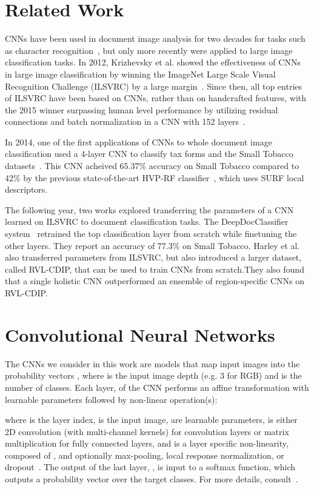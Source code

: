 \documentclass[10pt, conference, compsocconf]{IEEEtran}
\begin{document}
\section{Related Work}

CNNs have been used in document image analysis for two decades for tasks such as character recognition~\cite{lecun98,simard03}, but only more recently were applied to large image classification tasks.
In 2012, Krizhevsky et al. showed the effectiveness of CNNs in large image classification by winning the ImageNet Large Scale Visual Recognition Challenge (ILSVRC) by a large margin~\cite{krizhevsky12}.
Since then, all top entries of ILSVRC have been based on CNNs, rather than on handcrafted features, with the 2015 winner surpassing human level performance by utilizing residual connections and batch normalization in a CNN with 152 layers~\cite{he15residual}.

In 2014, one of the first applications of CNNs to whole document image classification used a 4-layer CNN to classify tax forms and the Small Tobacco datasets~\cite{kang14}.
This CNN acheived 65.37\% accuracy on Small Tobacco compared to 42\% by the previous state-of-the-art HVP-RF classifier~\cite{kumar13}, which uses SURF local descriptors.

The following year, two works explored transferring the parameters of a CNN learned on ILSVRC to document classification tasks.
The DeepDocClassifier system~\cite{afzal15} retrained the top classification layer from scratch while finetuning the other layers.
They report an accuracy of 77.3\% on Small Tobacco.
Harley et al.~\cite{harley15} also transferred parameters from ILSVRC, but also introduced a larger dataset, called RVL-CDIP, that can be used to train CNNs from scratch.They also found that a single holistic CNN outperformed an ensemble of region-specific CNNs on RVL-CDIP.

\section{Convolutional Neural Networks}

The CNNs we consider in this work are models that map input images  into the probability vectors , where  is the input image depth (e.g. 3 for RGB) and  is the number of classes.
Each layer, of the CNN performs an affine transformation with learnable parameters followed by non-linear operation(s):

where  is the layer index,  is the input image,  are learnable parameters,  is either 2D convolution (with multi-channel kernels) for convolution layers or matrix multiplication for fully connected layers, and  is a layer specific non-linearity, composed of , and optionally max-pooling, local response normalization, or dropout~\cite{krizhevsky12}.
The output of the last layer, , is input to a softmax function, which outputs a probability vector over the target classes.
For more details, consult~\cite{krizhevsky12}.
\end{document}
